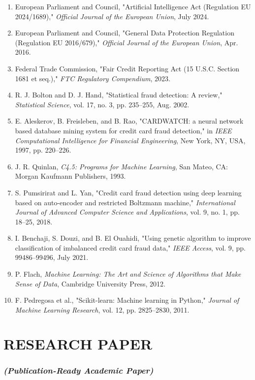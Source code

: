 \documentclass[12pt,a4paper,oneside]{report}
\begin{document}
\begin{enumerate}[leftmargin=0.35in]
\item European Parliament and Council, "Artificial Intelligence Act (Regulation EU 2024/1689)," \textit{Official Journal of the European Union}, July 2024.
\item European Parliament and Council, "General Data Protection Regulation (Regulation EU 2016/679)," \textit{Official Journal of the European Union}, Apr. 2016.
\item Federal Trade Commission, "Fair Credit Reporting Act (15 U.S.C. Section 1681 et seq.)," \textit{FTC Regulatory Compendium}, 2023.
\item R. J. Bolton and D. J. Hand, "Statistical fraud detection: A review," \textit{Statistical Science}, vol. 17, no. 3, pp. 235--255, Aug. 2002.
\item E. Aleskerov, B. Freisleben, and B. Rao, "CARDWATCH: a neural network based database mining system for credit card fraud detection," in \textit{IEEE Computational Intelligence for Financial Engineering}, New York, NY, USA, 1997, pp. 220--226.
\item J. R. Quinlan, \textit{C4.5: Programs for Machine Learning}, San Mateo, CA: Morgan Kaufmann Publishers, 1993.
\item S. Pumsirirat and L. Yan, "Credit card fraud detection using deep learning based on auto-encoder and restricted Boltzmann machine," \textit{International Journal of Advanced Computer Science and Applications}, vol. 9, no. 1, pp. 18--25, 2018.
\item I. Benchaji, S. Douzi, and B. El Ouahidi, "Using genetic algorithm to improve classification of imbalanced credit card fraud data," \textit{IEEE Access}, vol. 9, pp. 99486--99496, July 2021.
\item P. Flach, \textit{Machine Learning: The Art and Science of Algorithms that Make Sense of Data}, Cambridge University Press, 2012.
\item F. Pedregosa et al., "Scikit-learn: Machine learning in Python," \textit{Journal of Machine Learning Research}, vol. 12, pp. 2825--2830, 2011.
\end{enumerate}

\newpage


\chapter*{RESEARCH PAPER}
\subsection{\textit{(Publication-Ready Academic Paper)}}
\end{document}
